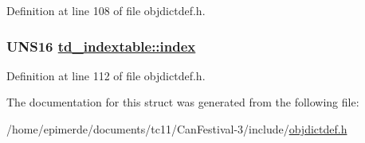 Definition at line 108 of file objdictdef.h.\hypertarget{structtd__indextable_1e4c3fb3d8fae2756c13bc5dad9caf0c}{
\subsubsection[index]{\setlength{\rightskip}{0pt plus 5cm}UNS16 \hyperlink{structtd__indextable_1e4c3fb3d8fae2756c13bc5dad9caf0c}{td\_\-indextable::index}}}
\label{structtd__indextable_1e4c3fb3d8fae2756c13bc5dad9caf0c}




Definition at line 112 of file objdictdef.h.

The documentation for this struct was generated from the following file:\begin{CompactItemize}
\item 
/home/epimerde/documents/tc11/Can\-Festival-3/include/\hyperlink{objdictdef_8h}{objdictdef.h}\end{CompactItemize}

